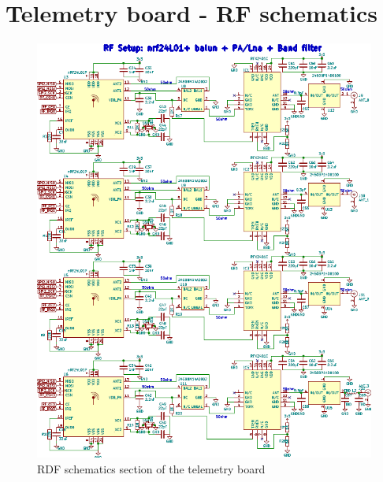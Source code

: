\chapter{Telemetry board - RF schematics}
\begin{figure}[h!]
\hspace*{-0.5cm}
\includegraphics[scale=0.96]{figures/RFschematics.PNG}
\caption{RDF schematics section of the telemetry board}
\end{figure}